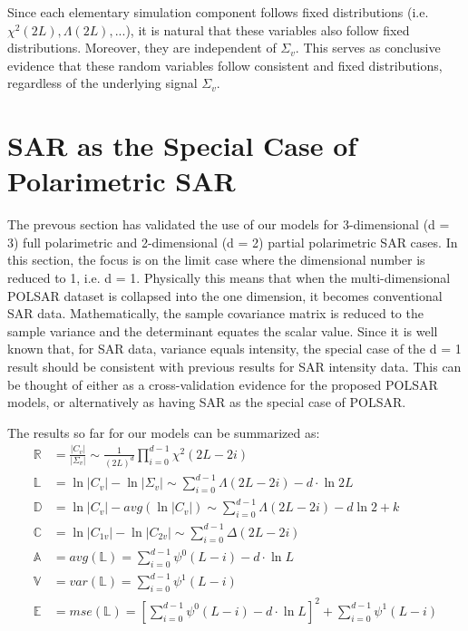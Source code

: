 Since each elementary simulation component follows fixed distributions (i.e. $\chi^2(2L), \Lambda(2L), ... $),
  it is natural that these variables also follow fixed distributions.
Moreover, they are independent of $\Sigma_v$.
This serves as conclusive evidence that
  these random variables follow consistent and fixed distributions,
  regardless of the underlying signal $\Sigma_v$.

\section{SAR as the Special Case of Polarimetric SAR}
\label{sec:sar_special_case_of_polsar}

The prevous section has validated the use of our models for 3-dimensional (d = 3)
full polarimetric and 2-dimensional (d = 2) partial polarimetric SAR cases. In this
section, the focus is on the limit case where the dimensional number is reduced to 1,
i.e. d = 1. Physically this means that when the multi-dimensional POLSAR dataset is collapsed
into the one dimension, it becomes conventional  SAR data. Mathematically, the sample covariance
matrix is reduced to the sample variance and the determinant equates the scalar value.
Since  it is well known that, for SAR data, variance equals intensity,
the special case of the d = 1 result should be consistent
with previous results for SAR intensity data. This can be thought of either as a cross-validation evidence for the proposed POLSAR models, or alternatively as having SAR
as the special case of POLSAR.

The results so far for our models can be summarized as:
{\footnotesize
\begin{align}
  \mathbb{R} &= \frac{|C_v|}{|\Sigma_v|} \sim \frac{1}{(2L)^d} \prod^{d-1}_{i=0} \chi^2(2L-2i) \\%
  \mathbb{L} &= \ln{|C_v|} - \ln{|\Sigma_v|} \sim \sum^{d-1}_{i=0} \Lambda(2L-2i) - d \cdot \ln{2L} \\ %
  \mathbb{D} &= \ln{|C_v|} - avg(\ln{|C_v|}) \sim \sum^{d-1}_{i=0} \Lambda(2L-2i) - d \ln{2} + k\\
  \mathbb{C} &= \ln{|C_{1v}|} - \ln{|C_{2v}|} \sim \sum^{d-1}_{i=0} \Delta(2L-2i) \\
  \mathbb{A} &= avg(\mathbb{L}) = \sum^{d-1}_{i=0} \psi^0(L-i) - d \cdot \ln{L} \\ %
  \mathbb{V} &= var(\mathbb{L}) = \sum^{d-1}_{i=0} \psi^1(L-i) \\ %
  \mathbb{E} &= mse(\mathbb{L}) =\left[ \sum^{d-1}_{i=0} \psi^0(L-i) - d \cdot \ln{L} \right]^2 +  \sum^{d-1}_{i=0} \psi^1(L-i) %
\end{align}
}%

